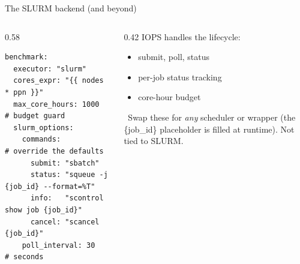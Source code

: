\documentclass[aspectratio=169,11pt]{beamer}
\newcommand{\code}[1]{{\ttfamily\small\color{iopsNavy}#1}}
\begin{document}
\begin{frame}[fragile]{The SLURM backend (and beyond)}
  \begin{columns}[T]
    \begin{column}{0.58\textwidth}
\begin{lstlisting}[style=yaml,basicstyle=\ttfamily\fontsize{6.8}{8}\selectfont,columns=fixed]
benchmark:
  executor: "slurm"
  cores_expr: "{{ nodes * ppn }}"
  max_core_hours: 1000          # budget guard
  slurm_options:
    commands:                   # override the defaults
      submit: "sbatch"
      status: "squeue -j {job_id} --format=%T"
      info:   "scontrol show job {job_id}"
      cancel: "scancel {job_id}"
    poll_interval: 30           # seconds
\end{lstlisting}
    \end{column}
    \begin{column}{0.42\textwidth}
      IOPS handles the lifecycle:
      \begin{itemize}
        \item submit, poll, status
        \item per-job status tracking
        \item core-hour budget
      \end{itemize}
      \vspace{0.3em}
      \begin{keybox}[colback=iopsGreen!10, colframe=iopsGreen]
        \faSlidersH~Swap these for \emph{any} scheduler or wrapper (the
        \code{\{job\_id\}} placeholder is filled at runtime). Not tied to SLURM.
      \end{keybox}
    \end{column}
  \end{columns}
\end{frame}
\end{document}

